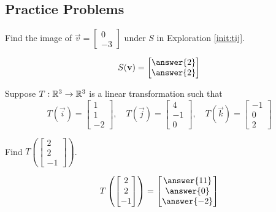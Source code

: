 \documentclass{ximera}
\begin{document}
\subsection*{Practice Problems}
\begin{problem}\label{prob:imageunderS1}
Find the image of $\vec{v}=\begin{bmatrix}0\\-3\end{bmatrix}$ under $S$ in Exploration \ref{init:tij}.

$$S(\vec{v})=\begin{bmatrix}\answer{2}\\\answer{2}\end{bmatrix}$$
\end{problem}

\begin{problem}\label{prob:imageunderT1}

Suppose $T:\mathbb{R}^3\rightarrow \mathbb{R}^3$ is a linear transformation such that 
$$T(\vec{i})=\begin{bmatrix}1\\1\\-2\end{bmatrix},\quad T(\vec{j})=\begin{bmatrix}4\\-1\\0\end{bmatrix},\quad T(\vec{k})=\begin{bmatrix}-1\\0\\2\end{bmatrix}$$

Find $T\left(\begin{bmatrix}2\\2\\-1\end{bmatrix}\right)$.

$$T\left(\begin{bmatrix}2\\2\\-1\end{bmatrix}\right)=\begin{bmatrix}\answer{11}\\\answer{0}\\\answer{-2}\end{bmatrix}$$
\end{problem}
\end{document}
